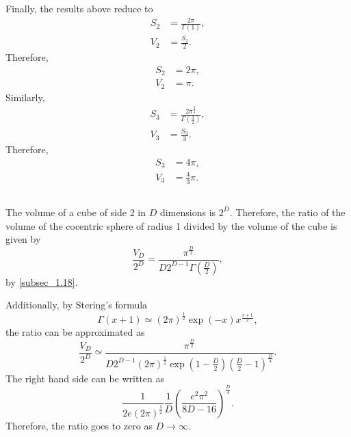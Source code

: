 Finally, the results above reduce to
%
\begin{equation}
\begin{aligned}
S_2 &= \frac{2 \pi}{\Gamma(1)}, \\
V_2 &= \frac{S_2}{2}. 
\end{aligned}
\end{equation}
%
Therefore, 
%
\begin{equation}
\begin{aligned}
S_2 &= 2 \pi, \\
V_2 &= \pi. 
\end{aligned}
\end{equation}
%
Similarly,
%
\begin{equation}
\begin{aligned}
S_3 &= \frac{2 \pi ^ \frac{3}{2}}{\Gamma \left( \frac{3}{2} \right)}, \\
V_3 &= \frac{S_3}{3}. 
\end{aligned}
\end{equation}
%
Therefore, 
%
\begin{equation}
\begin{aligned}
S_3 &= 4 \pi, \\
V_3 &= \frac{4}{3} \pi. 
\end{aligned}
\end{equation}
%


\subsection{}
The volume of a cube of side 2 in $D$ dimensions is $2 ^ D$. 
Therefore, the ratio of the volume of the cocentric sphere of radius 1 divided by the volume of the cube is given by
%
\begin{equation}
\frac{V_D}{2 ^ D} = \frac{\pi ^ \frac{D}{2}}{D 2 ^ {D - 1} \Gamma \left( \frac{D}{2} \right)},
\end{equation}
%
by \ref{subsec_1.18}.

Additionally, by Stering's formula
%
\begin{equation}
\Gamma(x + 1) \simeq (2 \pi) ^ \frac{1}{2} \exp(- x) x ^ {\frac{x + 1}{2}},
\end{equation}
%
the ratio can be approximated as
%
\begin{equation}
\frac{V_D}{2 ^ D} \simeq \frac{\pi ^ \frac{D}{2}}{D 2 ^ {D - 1} (2 \pi) ^ \frac{1}{2} \exp \left( 1 - \frac{D}{2} \right) \left( \frac{D}{2} - 1 \right) ^ \frac{D}{4}}.
\end{equation}
%
The right hand side can be written as 
%
\begin{equation}
\frac{1}{2 e (2 \pi) ^ \frac{1}{2}} \frac{1}{D} \left( \frac{e ^ 2 \pi ^ 2}{ 8 D - 16} \right) ^ \frac{D}{4}.
\end{equation}
%
Therefore, the ratio goes to zero as $D \to \infty$.

